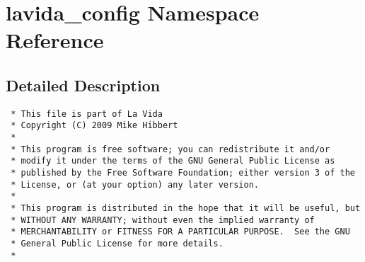 \hypertarget{namespacelavida__config}{
\section{lavida\_\-config Namespace Reference}
\label{namespacelavida__config}
}




\subsection{Detailed Description}


\footnotesize\begin{verbatim}
 * This file is part of La Vida
 * Copyright (C) 2009 Mike Hibbert
 *
 * This program is free software; you can redistribute it and/or
 * modify it under the terms of the GNU General Public License as
 * published by the Free Software Foundation; either version 3 of the
 * License, or (at your option) any later version.
 *
 * This program is distributed in the hope that it will be useful, but
 * WITHOUT ANY WARRANTY; without even the implied warranty of
 * MERCHANTABILITY or FITNESS FOR A PARTICULAR PURPOSE.  See the GNU
 * General Public License for more details.
 *
\end{verbatim}
\normalsize
 